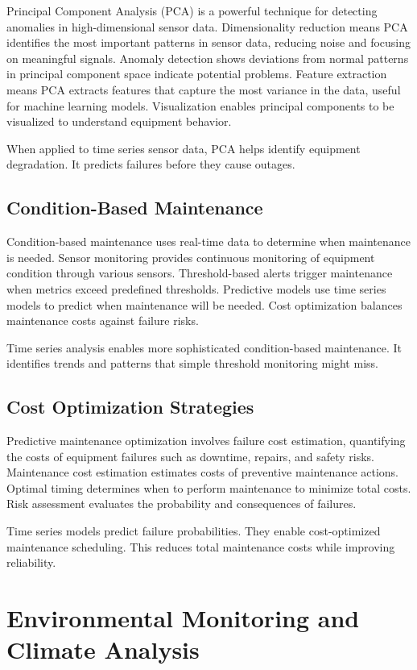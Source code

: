 Principal Component Analysis (PCA) is a powerful technique for detecting anomalies in high-dimensional sensor data. Dimensionality reduction means PCA identifies the most important patterns in sensor data, reducing noise and focusing on meaningful signals. Anomaly detection shows deviations from normal patterns in principal component space indicate potential problems. Feature extraction means PCA extracts features that capture the most variance in the data, useful for machine learning models. Visualization enables principal components to be visualized to understand equipment behavior.

When applied to time series sensor data, PCA helps identify equipment degradation. It predicts failures before they cause outages.

\subsection{Condition-Based Maintenance}

Condition-based maintenance uses real-time data to determine when maintenance is needed. Sensor monitoring provides continuous monitoring of equipment condition through various sensors. Threshold-based alerts trigger maintenance when metrics exceed predefined thresholds. Predictive models use time series models to predict when maintenance will be needed. Cost optimization balances maintenance costs against failure risks.

Time series analysis enables more sophisticated condition-based maintenance. It identifies trends and patterns that simple threshold monitoring might miss.

\subsection{Cost Optimization Strategies}

Predictive maintenance optimization involves failure cost estimation, quantifying the costs of equipment failures such as downtime, repairs, and safety risks. Maintenance cost estimation estimates costs of preventive maintenance actions. Optimal timing determines when to perform maintenance to minimize total costs. Risk assessment evaluates the probability and consequences of failures.

Time series models predict failure probabilities. They enable cost-optimized maintenance scheduling. This reduces total maintenance costs while improving reliability.

\section{Environmental Monitoring and Climate Analysis}

